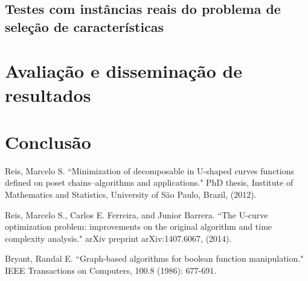\documentclass[12pt]{article}
\begin{document}
\subsection{Testes com instâncias reais do problema de seleção de 
            características}
\section{Avaliação e disseminação de resultados}
\section{Conclusão}
\pagebreak


\begin{thebibliography}{9} \label{sec:referencias}


Reis, Marcelo S. ``Minimization of decomposable in U-shaped curves functions defined on poset chains–algorithms and applications." PhD thesis, Institute of Mathematics and Statistics, University of São Paulo, Brazil, (2012).

Reis, Marcelo S., Carlos E. Ferreira, and Junior Barrera. ``The U-curve optimization problem: improvements on the original algorithm and time complexity analysis." arXiv preprint arXiv:1407.6067, (2014). 


Bryant, Randal E. ``Graph-based algorithms for boolean function manipulation." IEEE Transactions on Computers, 100.8 (1986): 677-691. 


\end{thebibliography}
\end{document}
